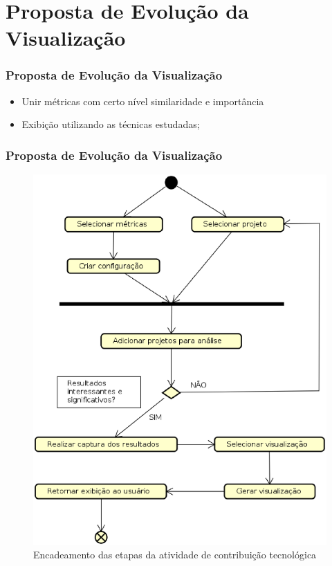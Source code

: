\documentclass{beamer}
\begin{document}
\section{Proposta de Evolução da Visualização} %

\begin{frame}
\frametitle{Proposta de Evolução da Visualização}
\begin{itemize}
\item Unir métricas com certo nível similaridade e importância
\item Exibição utilizando as técnicas estudadas;
\end{itemize}
\end{frame}


\begin{frame}
\frametitle{Proposta de Evolução da Visualização}
\begin{figure}[!htb]
  \centering
    \includegraphics[keepaspectratio=true,scale=0.25]
    {../figuras/metodotologia_atividades.eps}
  \caption{Encadeamento das etapas da atividade de contribuição tecnológica}
  \label{fig:parallel}
\end{figure}
\end{frame}
\end{document}

